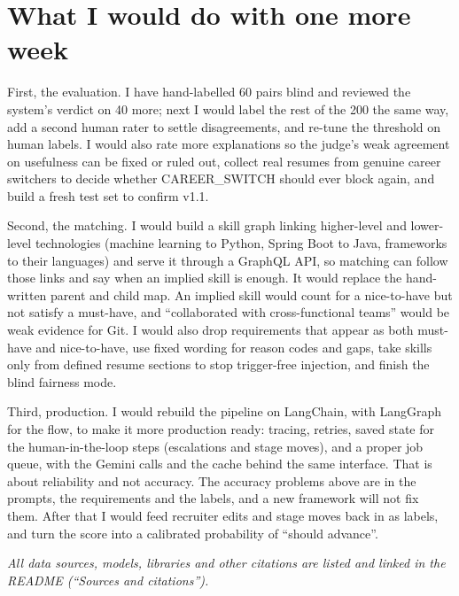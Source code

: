 \documentclass[conference]{styles/acmsiggraph}
\newcommand{\code}[1]{\textsf{\small #1}}
\begin{document}
\section{What I would do with one more week}

First, the evaluation. I have hand-labelled 60 pairs blind and reviewed the system's verdict on 40 more; next I would label the rest of the 200 the same way, add a second human rater to settle disagreements, and re-tune the threshold on human labels. I would also rate more explanations so the judge's weak agreement on usefulness can be fixed or ruled out, collect real resumes from genuine career switchers to decide whether \code{CAREER\_SWITCH} should ever block again, and build a fresh test set to confirm v1.1.

Second, the matching. I would build a skill graph linking higher-level and lower-level technologies (machine learning to Python, Spring Boot to Java, frameworks to their languages) and serve it through a GraphQL API, so matching can follow those links and say when an implied skill is enough. It would replace the hand-written parent and child map. An implied skill would count for a nice-to-have but not satisfy a must-have, and ``collaborated with cross-functional teams'' would be weak evidence for Git. I would also drop requirements that appear as both must-have and nice-to-have, use fixed wording for reason codes and gaps, take skills only from defined resume sections to stop trigger-free injection, and finish the blind fairness mode.

Third, production. I would rebuild the pipeline on LangChain, with LangGraph for the flow, to make it more production ready: tracing, retries, saved state for the human-in-the-loop steps (escalations and stage moves), and a proper job queue, with the Gemini calls and the cache behind the same interface. That is about reliability and not accuracy. The accuracy problems above are in the prompts, the requirements and the labels, and a new framework will not fix them. After that I would feed recruiter edits and stage moves back in as labels, and turn the score into a calibrated probability of ``should advance''.

\vspace{4pt}
\noindent\textit{All data sources, models, libraries and other citations are listed and linked in the README (``Sources and citations'').}
\end{document}
